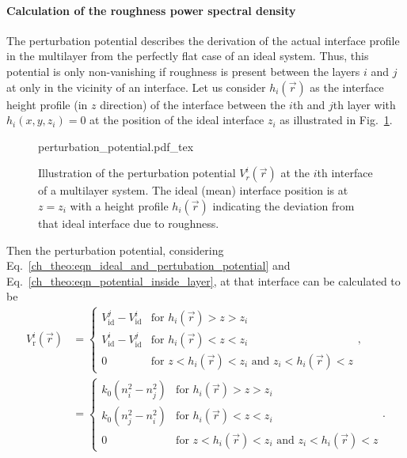 \paragraph{Calculation of the roughness power spectral density}
The perturbation potential describes the derivation of the actual interface profile in the multilayer from the perfectly flat case of an ideal system. Thus, this potential is only non-vanishing if roughness is present between the layers $i$ and $j$ at only in the vicinity of an interface. Let us consider $h_i(\vec{r})$ as the interface height profile (in $z$ direction) of the interface between the $i$th and $j$th layer with $h_i(x,y,z_i) = 0$ at the position of the ideal interface $z_i$ as illustrated in Fig.~\ref{ch_theo:fig_perturbation_potential}.
\begin{figure}[htb]
    \def\svgwidth{0.6\textwidth}
    {perturbation_potential.pdf_tex}
    \caption[Illustration of the perturbation potential $V^i_r(\vec{r})$ at the $i$th interface of a multilayer system.]{Illustration of the perturbation potential $V^i_r(\vec{r})$ at the $i$th interface of a multilayer system. The ideal (mean) interface position is at $z=z_i$ with a height profile $h_i(\vec{r})$ indicating the deviation from that ideal interface due to roughness.}
    \label{ch_theo:fig_perturbation_potential}
\end{figure}
Then the perturbation potential, considering Eq.~\eqref{ch_theo:eqn_ideal_and_pertubation_potential} and Eq.~\eqref{ch_theo:eqn_potential_inside_layer}, at that interface can be calculated to be
\begin{align}
 V^i_\text{r}(\vec{r}) &= \begin{cases}
                        V^j_\text{id} - V^i_\text{id} &\text{for $h_i(\vec{r}) > z > z_i$}  \\
                        V^i_\text{id} - V^j_\text{id} &\text{for $h_i(\vec{r}) < z < z_i$} \\
                        0 &\text{for $z<h_i(\vec{r}) < z_i$ and $z_i < h_i(\vec{r}) < z$}
                    \end{cases} \text{,}\nonumber \\
                    &=\begin{cases}
                        k_0(n_i^2 - n_j^2) &\text{for $h_i(\vec{r}) > z > z_i$}  \\
                        k_0(n_j^2 - n_i^2)  &\text{for $h_i(\vec{r}) < z < z_i$} \\
                        0 &\text{for $z<h_i(\vec{r}) < z_i$ and $z_i < h_i(\vec{r}) < z$}
                       \end{cases} \text{.}\label{ch_theo:eqn_perturbation_potential_explicit}
\end{align}

